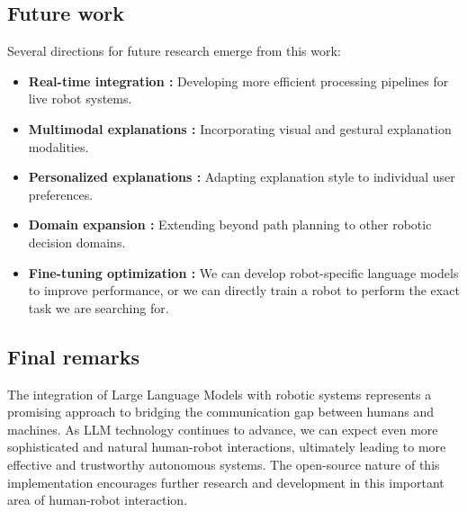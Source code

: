 \subsection{Future work}
Several directions for future research emerge from this work:
\begin{itemize}
    \item \textbf{Real-time integration :} Developing more efficient processing pipelines for live robot systems.
    \item \textbf{Multimodal explanations :} Incorporating visual and gestural explanation modalities.
    \item \textbf{Personalized explanations :} Adapting explanation style to individual user preferences.
    \item \textbf{Domain expansion :} Extending beyond path planning to other robotic decision domains.
    \item \textbf{Fine-tuning optimization :} We can develop robot-specific language models to improve performance, or we can directly train a robot to perform the exact task we are searching for.
\end{itemize}

\subsection{Final remarks}

The integration of Large Language Models with robotic systems represents a promising approach to bridging the communication gap between humans and machines. As LLM technology continues to advance, we can expect even more sophisticated and natural human-robot interactions, ultimately leading to more effective and trustworthy autonomous systems.
The open-source nature of this implementation encourages further research and development in this important area of human-robot interaction.

